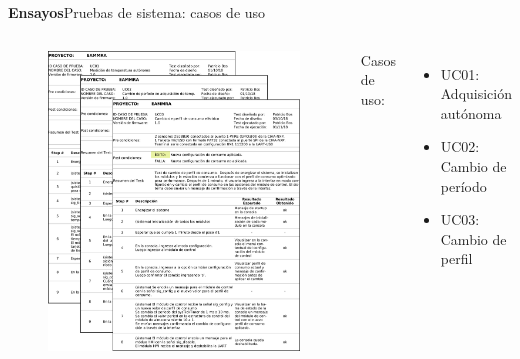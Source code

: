 \documentclass[11pt, xcolor={table,xcdraw}]{beamer}
\begin{document}
\begin{frame}{\textbf{\LARGE{Ensayos}}}{Pruebas de sistema: casos de uso}
	\vspace{-.75cm}
\begin{columns}
  \column{.53\paperwidth}
  \hspace{.5cm}
	\begin{figure}[H]
	  \includegraphics[height=.8\textheight]{./imagenes/UseCase.png}
	\end{figure}	
	\hfill
	\column{.47\paperwidth} 	
	Casos de uso:
	\vspace{5px}
	  \begin{itemize}[]
		  \item UC01: Adquisición autónoma
		  \item UC02: Cambio de período
		  \item UC03: Cambio de perfil
		\end{itemize}
	\end{columns}
\end{frame}
\end{document}
